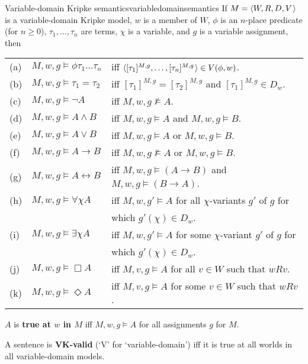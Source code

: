 \begin{definition}{Variable-domain Kripke semantics}{variabledomainsemantics}
  If $\Mfr = \t{W,R,D,V}$ is a variable-domain Kripke model, $w$ is a member of
  $W$, $\phi$ is an $n$-place predicate (for $n\geq 0$), $\tau_1,\ldots,\tau_n$
  are terms, $\chi$ is a variable, and $g$ is a variable assignment, then
  
  
  \medskip\hspace{-4mm}
  \begin{tabular}{lll}
    (a) & $M,w,g \models \phi \tau_1\ldots \tau_n$ &iff $\t{[\tau_1]^{M,g},\ldots,[\tau_n]^{M,g}} \in V(\phi,w)$.\\
    (b) & $M,w,g \models \tau_1=\tau_2$ &iff $[\tau_1]^{M,g} = [\tau_2]^{M,g}$ and $[\tau_1]^{M,g} \in D_w$.\\
    (c) & $M,w,g \models \neg A$ &iff $M,w,g \not\models A$.\\
    (d) & $M,w,g \models A \land B$ &iff $M,w,g \models A$ and $M,w,g \models B$.\\
    (e) & $M,w,g \models A \lor B$ &iff $M,w,g \models A$ or $M,w,g \models B$.\\
    (f) & $M,w,g \models A \to B$ &iff $M,w,g \not\models A$ or $M,w,g \models B$.\\
    (g) & $M,w,g \models A \leftrightarrow B$ &iff $M,w,g \models (A\to B)$ and $M,w,g \models (B\to A)$.\\
    (h) & $M,w,g \models \forall \chi A$ &iff $M,w,g' \models A$ for all $\chi$-variants $g'$ of $g$ for\\[-1mm]
        && which $g'(\chi)\in D_w$.\\
    (i) & $M,w,g \models \exists \chi A$ &iff $M,w,g' \models A$ for some $\chi$-variant $g'$ of $g$ for\\[-1mm]
        && which $g'(\chi)\in D_w$.\\
    (j) & $M,w,g \models \Box A$ &iff $M,v,g \models A$ for all $v\in W$ such that $wRv$.\\
    (k) & $M,w,g \models \Diamond A$ &iff $M,v,g \models A$ for some $v\in W$ such that $wRv$.
  \end{tabular}

  \medskip
  $A$ is \textbf{true at $w$ in $M$} iff $M,w,g \models A$ for all assignments
  $g$ for $M$.
\end{definition}

A sentence is \textbf{VK-valid} (`V' for `variable-domain') iff it is true at all
worlds in all variable-domain models.


